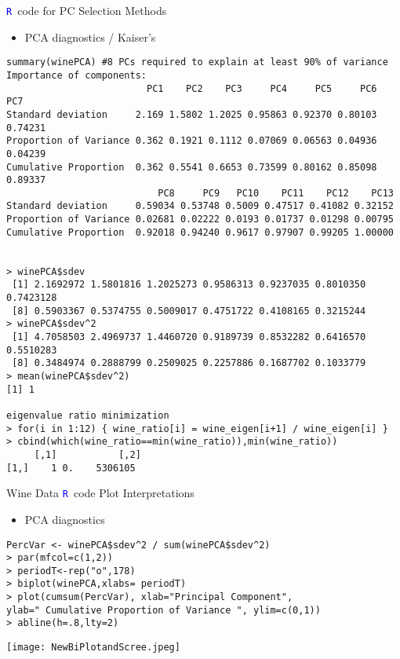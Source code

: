 \documentclass[notes=show]{beamer}
\newcommand \bit  {\begin{itemize}}
\newcommand \eit  {\end{itemize}}
\newcommand{\textR}[1]{\textcolor{blue}{\texttt{#1}}}
\newcommand{\R}{\textR{R}}
\begin{document}
\begin{frame}[fragile]{\R \, code for PC Selection Methods}

\bit
\item PCA diagnostics / Kaiser’s 
\eit
\vspace{.25 cm}
{\tiny
\begin{Verbatim}[formatcom=\color{blue}]
    summary(winePCA) #8 PCs required to explain at least 90% of variance
Importance of components:
                         PC1    PC2    PC3     PC4     PC5     PC6     PC7
Standard deviation     2.169 1.5802 1.2025 0.95863 0.92370 0.80103 0.74231
Proportion of Variance 0.362 0.1921 0.1112 0.07069 0.06563 0.04936 0.04239
Cumulative Proportion  0.362 0.5541 0.6653 0.73599 0.80162 0.85098 0.89337
                           PC8     PC9   PC10    PC11    PC12    PC13
Standard deviation     0.59034 0.53748 0.5009 0.47517 0.41082 0.32152
Proportion of Variance 0.02681 0.02222 0.0193 0.01737 0.01298 0.00795
Cumulative Proportion  0.92018 0.94240 0.9617 0.97907 0.99205 1.00000


> winePCA$sdev
 [1] 2.1692972 1.5801816 1.2025273 0.9586313 0.9237035 0.8010350 0.7423128
 [8] 0.5903367 0.5374755 0.5009017 0.4751722 0.4108165 0.3215244
> winePCA$sdev^2
 [1] 4.7058503 2.4969737 1.4460720 0.9189739 0.8532282 0.6416570 0.5510283
 [8] 0.3484974 0.2888799 0.2509025 0.2257886 0.1687702 0.1033779
> mean(winePCA$sdev^2)
[1] 1

eigenvalue ratio minimization
> for(i in 1:12) { wine_ratio[i] = wine_eigen[i+1] / wine_eigen[i] }
> cbind(which(wine_ratio==min(wine_ratio)),min(wine_ratio))
     [,1]           [,2]
[1,]    1 0.    5306105
\end{Verbatim}
}
\end{frame}




\begin{frame}[fragile]{Wine Data \R \, code Plot Interpretations}

\bit
\item PCA diagnostics
\eit
\vspace{.25 cm}
{\tiny
\begin{Verbatim}[formatcom=\color{blue}]
PercVar <- winePCA$sdev^2 / sum(winePCA$sdev^2)
> par(mfcol=c(1,2))
> periodT<-rep("o",178)
> biplot(winePCA,xlabs= periodT)
> plot(cumsum(PercVar), xlab="Principal Component",
ylab=" Cumulative Proportion of Variance ", ylim=c(0,1))
> abline(h=.8,lty=2)
\end{Verbatim}

\vspace{-1mm}
\texttt{[image: NewBiPlotandScree.jpeg]}
     
}
\end{frame}
\end{document}

